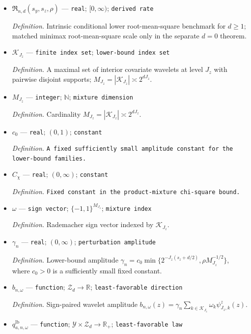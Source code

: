 \documentclass{article}
\begin{document}
\begin{itemize}
  \item \(\mathfrak R_{n,d}(s_y,s_z,\rho)\) --- \texttt{real}; \([0,\infty)\); \texttt{derived rate}
  \par\smallskip\noindent\emph{Definition.} Intrinsic conditional lower root-mean-square benchmark for \(d\ge1\); matched minimax root-mean-square scale only in the separate \(d=0\) theorem.
  \item \(\mathcal K_{J_z}\) --- \texttt{finite index set}; \texttt{lower-\allowbreak{}bound index set}
  \par\smallskip\noindent\emph{Definition.} A maximal set of interior covariate wavelets at level \(J_z\) with pairwise disjoint supports; \(M_{J_z}=|\mathcal K_{J_z}|\asymp2^{dJ_z}\).
  \item \(M_{J_z}\) --- \texttt{integer}; \(\mathbb N\); \texttt{mixture dimension}
  \par\smallskip\noindent\emph{Definition.} Cardinality \(M_{J_z}=|\mathcal K_{J_z}|\asymp2^{dJ_z}\).
  \item \(c_0\) --- \texttt{real}; \((0,1)\); \texttt{constant}
  \par\smallskip\noindent\emph{Definition.} \texttt{A fixed sufficiently small amplitude constant for the lower-\allowbreak{}bound families.}
  \item \(C_{\chi}\) --- \texttt{real}; \((0,\infty)\); \texttt{constant}
  \par\smallskip\noindent\emph{Definition.} \texttt{Fixed constant in the product-\allowbreak{}mixture chi-\allowbreak{}square bound.}
  \item \(\omega\) --- \texttt{sign vector}; \(\{-1,1\}^{M_{J_z}}\); \texttt{mixture index}
  \par\smallskip\noindent\emph{Definition.} Rademacher sign vector indexed by \(\mathcal K_{J_z}\).
  \item \(\gamma_n\) --- \texttt{real}; \((0,\infty)\); \texttt{perturbation amplitude}
  \par\smallskip\noindent\emph{Definition.} Lower-bound amplitude \(\gamma_n=c_0\min\{2^{-J_z(s_z+d/2)},\rho M_{J_z}^{-1/2}\}\), where \(c_0>0\) is a sufficiently small fixed constant.
  \item \(b_{n,\omega}\) --- \texttt{function}; \(\mathcal Z_d\to\mathbb R\); \texttt{least-\allowbreak{}favorable direction}
  \par\smallskip\noindent\emph{Definition.} Sign-paired wavelet amplitude \(b_{n,\omega}(z)=\gamma_n\sum_{k\in\mathcal K_{J_z}}\omega_k\psi^z_{J_z,k}(z)\).
  \item \(q_{a,n,\omega}^{\mathrm{lb}}\) --- \texttt{function}; \(\mathcal Y\times\mathcal Z_d\to\mathbb R_+\); \texttt{least-\allowbreak{}favorable law}

\end{itemize}
\end{document}
